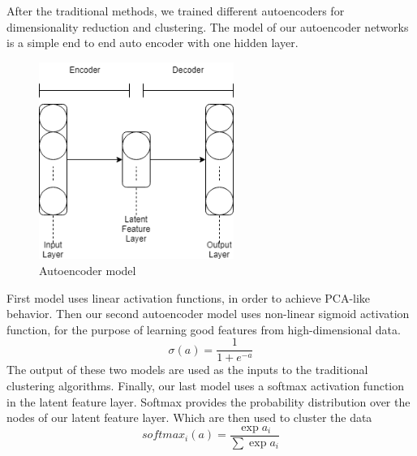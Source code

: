 \documentclass[journal]{IEEEtran}
\begin{document}
After the traditional methods, we trained different autoencoders for dimensionality reduction and clustering. The model of our autoencoder networks is a simple end to end auto encoder with one hidden layer.
\begin{figure}[!ht]
  \centering
  \includegraphics[width=2.5in]{images/ae_model.png}
  \caption{Autoencoder model
  }
  \label{fig_ae_model}
  \end{figure}
First model uses linear activation functions, in order to achieve PCA-like behavior. Then our second autoencoder model uses non-linear sigmoid activation function, for the purpose of learning good features from high-dimensional data. 
\begin{equation}
  \sigma(a)=\frac{1}{1+e^{-a}}
\end{equation}
The output of these two models are used as the inputs to the traditional clustering algorithms. 
Finally, our last model uses a softmax activation function in the latent feature layer. Softmax provides the probability distribution over the nodes of our latent feature layer. Which are then used to cluster the data
\begin{equation}
  softmax_i(a)=\frac{\exp{a_i}}{\sum\exp{a_i}}
\end{equation}
\end{document}
